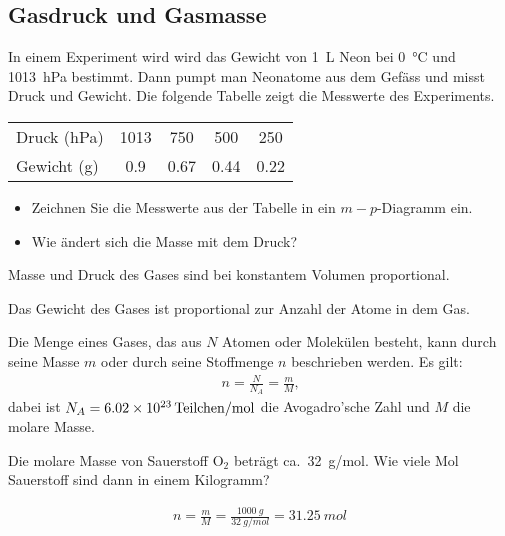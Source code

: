 
\subsection{Gasdruck und Gasmasse}
In einem Experiment wird wird das Gewicht von \SI{1}{L} Neon bei \SI{0}{\celsius} und \SI{1013}{hPa} bestimmt.
Dann pumpt man Neonatome aus dem Gefäss und misst Druck und Gewicht.
Die folgende Tabelle zeigt die Messwerte des Experiments.

\begin{center}
\begin{tabular}{lcccc}
	Druck (hPa)      & 1013      & 750        & 500        & 250 \\
	Gewicht (g)      & \num{0.9} & \num{0.67} & \num{0.44} & \num{0.22} \\
\end{tabular}
\end{center}

\begin{aufgabe}
	\begin{itemize}
		\item Zeichnen Sie die Messwerte aus der Tabelle in ein $m-p$-Diagramm ein.
		\item Wie ändert sich die Masse mit dem Druck?
	\end{itemize}
	\begin{loesung}
	Masse und Druck des Gases sind bei konstantem Volumen proportional.	
	\end{loesung}

\end{aufgabe}

Das Gewicht des Gases ist proportional zur Anzahl der Atome in dem Gas.


Die Menge eines Gases, das aus $N$ Atomen oder Molekülen besteht, kann durch seine Masse $m$
oder durch seine Stoffmenge $n$ beschrieben werden.
Es gilt:
\begin{eqnarray*}
	n=\frac{N}{N_A}=\frac{m}{M}\text{,} 
\end{eqnarray*}
dabei ist $N_A=\SI{6.02E23}{Teilchen/mol}$ die Avogadro'sche Zahl und $M$ die molare Masse.

\begin{aufgabe}
	Die molare Masse von Sauerstoff O$_2$ beträgt ca.~\SI{32}{g/mol}.
	Wie viele Mol Sauerstoff sind dann in einem Kilogramm?
	\begin{loesung}
		\begin{eqnarray*}
		n=\frac{m}{M}=\frac{\SI{1000}{g}}{\SI{32}{g/mol}}=\SI{31.25}{mol}
		\end{eqnarray*}
	\end{loesung}
\end{aufgabe}


